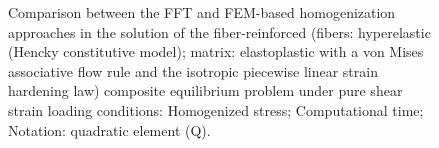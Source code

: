 \begin{figure}[hbt]
\begin{subfigure}[b]{0.49\textwidth}
      \caption{}
      \label{subfig:von_mises_res_mat_large_strain_2D_shear_material_response_error}
    \end{subfigure}
  \caption{Comparison between the FFT and FEM-based homogenization approaches in the solution of the fiber-reinforced (fibers: hyperelastic (Hencky constitutive model); matrix: elastoplastic with a von Mises associative flow rule and the isotropic piecewise linear strain hardening law) composite equilibrium problem under pure shear strain loading conditions:  Homogenized stress;  Computational time; Notation: quadratic element (Q).}
\label{fig:von_mises_res_mat_large_strain_2D_shear_material_response_and_error}
\end{figure}

